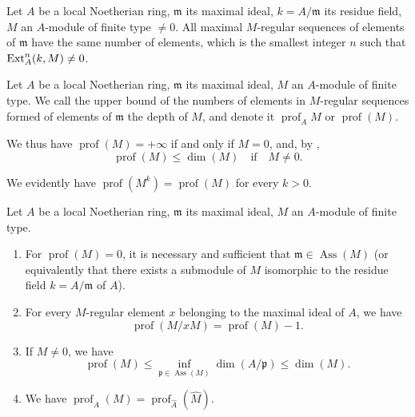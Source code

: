 \begin{corollary}[16.4.4]
\label{0.16.4.4}
Let $A$ be a local Noetherian ring, $\mathfrak{m}$ its maximal ideal, $k=A/\mathfrak{m}$ its residue field, $M$ an $A$-module of finite type $\neq 0$.
All maximal $M$-regular sequences of elements of $\mathfrak{m}$ have the same number of elements, which is the smallest integer $n$ such that $\operatorname{Ext}^n_A(k,M)\neq 0$.
\end{corollary}

\begin{definition}[16.4.5]
\label{0.16.4.5}
Let $A$ be a local Noetherian ring, $\mathfrak{m}$ its maximal ideal, $M$ an $A$-module of finite type.
We call the upper bound of the numbers of elements in $M$-regular sequences formed of elements of $\mathfrak{m}$ the depth of $M$, and denote it $\operatorname{prof}_AM$ or $\operatorname{prof}(M)$.
\end{definition}

We thus have $\operatorname{prof}(M)=+\infty$ if and only if $M=0$, and, by ,
\begin{equation}
\label{0.16.4.5.1}
\tag{16.4.5.1}
  \operatorname{prof}(M)\leq\dim(M)\quad\text{if}\quad M\neq 0.
\end{equation}

We evidently have $\operatorname{prof}(M^k)=\operatorname{prof}(M)$ for every $k>0$.

\begin{proposition}[16.4.6]
\label{0.16.4.6}
Let $A$ be a local Noetherian ring, $\mathfrak{m}$ its maximal ideal, $M$ an $A$-module of finite type.
\begin{enumerate}
  \item[\rm{(i)}]\label{0.16.4.6.i} For $\operatorname{prof}(M)=0$, it is necessary and sufficient that $\mathfrak{m}\in\operatorname{Ass}(M)$ \textup{(or equivalently that there exists a submodule of $M$ isomorphic to the residue field $k=A/\mathfrak{m}$ of $A$)}.
  \item[\rm{(ii)}] For every $M$-regular element $x$ belonging to the maximal ideal of $A$, we have
  \begin{equation}
  \label{0.16.4.6.1}
  \tag{16.4.6.1}
    \operatorname{prof}(M/x M)=\operatorname{prof}(M)-1.
  \end{equation}
  \item[\rm{(iii)}] If $M\neq 0$, we have
  \begin{equation}
  \label{0.16.4.6.2}
  \tag{16.4.6.2}
    \operatorname{prof}(M)\leq\inf_{\mathfrak{p}\in\operatorname{Ass}(M)}\dim(A/\mathfrak{p})\leq\dim(M).
  \end{equation}
  \item[\rm{(iv)}] We have $\operatorname{prof}_A(M)=\operatorname{prof}_{\widehat{A}}(\widehat{M})$.
\end{enumerate}
\end{proposition}


